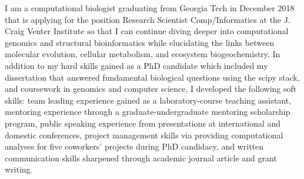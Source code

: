 

\begin{cventries}


\fontsize{10pt}{1em}\bodyfontlight\upshape\color{black}\justify
I am a computational biologist graduating from Georgia Tech in December 2018 that is applying for the position Research Scientist Comp/Informatics at the J. Craig Venter Institute so that I can continue diving deeper into computational genomics and structural bioinformatics while elucidating the links between molecular evolution, cellular metabolism, and ecosystem biogeochemistry. In addition to my hard skills gained as a PhD candidate which included my dissertation that answered fundamental biological questions using the scipy stack, and coursework in genomics and computer science, I developed the following soft skills: team leading experience gained as a laboratory-course teaching assistant, mentoring experience through a graduate-undergraduate mentoring scholarship program, public speaking experience from presentations at international and domestic conferences, project management skills via providing computational analyses for five coworkers' projects during PhD candidacy, and written communication skills sharpened through academic journal article and grant writing.
    
\vspace{-2.0mm}
\end{cventries}
